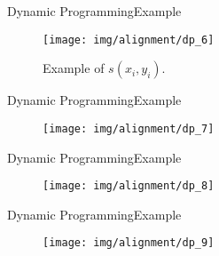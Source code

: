 \documentclass[10pt]{beamer}
\newcommand{\1}{
	\setbeamertemplate{background}{
		\texttt{[image: img/1]}
		\tikz[overlay] \fill[fill opacity=0.75,fill=white] (0,0) rectangle (-\paperwidth,\paperheight);
	}
}
\begin{document}
\begin{frame}{Dynamic Programming}{Example}			
	\begin{figure}[]
		\centering
		\texttt{[image: img/alignment/dp\_6]}
		\label{img:uniprot}
		\caption{Example of $s(x_i, y_i)$.}
	\end{figure}	
	
\end{frame}

\begin{frame}{Dynamic Programming}{Example}	
	\begin{figure}[]
		\centering
		\texttt{[image: img/alignment/dp\_7]}
		\label{img:uniprot}
	\end{figure}	
	
\end{frame}

\begin{frame}{Dynamic Programming}{Example}	
	\begin{figure}[]
		\centering
		\texttt{[image: img/alignment/dp\_8]}
		\label{img:uniprot}
	\end{figure}	
	
\end{frame}

\begin{frame}{Dynamic Programming}{Example}	
	\begin{figure}[]
		\centering
		\texttt{[image: img/alignment/dp\_9]}
		\label{img:uniprot}
	\end{figure}	
	
\end{frame}
\end{document}
